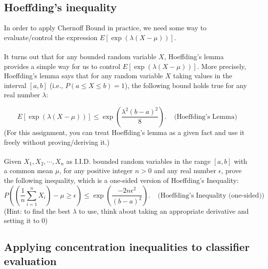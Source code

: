 \documentclass{exam}
\begin{document}
\subsection{Hoeffding's inequality}
In order to apply Chernoff Bound in practice, we need some way to evaluate/control the expression $E[\exp(\lambda (X - \mu))]$. 
\\\\It turns out that for any bounded random variable $X$, Hoeffding's lemma provides a simple way for us to control  $E[\exp(\lambda (X - \mu))]$. 
More precisely, Hoeffding's lemma says that for any random variable $X$ taking values in the interval $[a, b]$ (i.e., $P(a \leq X \leq b) = 1$), the following bound holds true for any real number $\lambda$: 

$$E[\exp\left(\lambda (X - \mu)\right)] \leq \exp\left(\frac{\lambda^2 (b-a)^2}{8}\right).\;\;\;\; \textrm{(Hoeffding's Lemma)}$$
(For this assignment, you can treat Hoeffding's lemma as a given fact and use it freely without proving/deriving it.) 
\\\\
Given $X_1, X_2, \cdots, X_n$ as I.I.D. bounded random variables in the range $[a, b]$ with a common mean $\mu$, for any positive integer $n > 0$ and any real number $\epsilon$, prove the following inequality, which is a one-sided version of Hoeffding's Inequality: 
$$P\left(\left(\frac{1}{n} \sum_{i = 1}^n X_i\right) - \mu \geq \epsilon \right) \leq \exp\left(\frac{-2n\epsilon^2}{(b-a)^2}
\right).\;\;\;\; \textrm{(Hoeffding's Inequality (one-sided))}$$
(Hint: to find the best $\lambda$ to use, think about taking an appropriate derivative and setting it to 0)
\subsection{Applying concentration inequalities to classifier evaluation}
\end{document}
